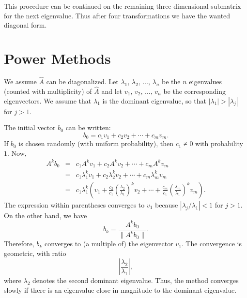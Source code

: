 This procedure can be continued on the remaining three-dimensional
submatrix for the next eigenvalue. Thus after four transformations    
we have the wanted diagonal form.
\section{Power Methods}
We assume $\hat{A}$ can be diagonalized.
Let $\lambda_1$, $\lambda_2$, $\dots$, $\lambda_n$ be the 
$n$ eigenvalues (counted with multiplicity) of $\hat{A}$ 
and let $v_1$, $v_2$, $\dots$, $v_n$ be the corresponding eigenvectors. We assume that $\lambda_1$ is the dominant eigenvalue, 
so that $|\lambda_1| > | \lambda_j |$ for $j > 1$.

The initial vector $b_0$ can be written:
\[
    b_0 = c_{1}v_{1} + c_{2}v_{2} + \cdots + c_{m}v_{m}.
\]
If $b_0$ is chosen randomly (with uniform probability), then $c_1$ ≠ 0 with probability $1$. Now,
\[
    \begin{array}{lcl}A^{k}b_0 & = & c_{1}A^{k}v_{1} + c_{2}A^{k}v_{2} + \cdots + c_{m}A^{k}v_{m} \\ & = & c_{1}\lambda_{1}^{k}v_{1} + c_{2}\lambda_{2}^{k}v_{2} + \cdots + c_{m}\lambda_{m}^{k}v_{m} \\ & = & c_{1}\lambda_{1}^{k} \left( v_{1} + \frac{c_{2}}{c_{1}}\left(\frac{\lambda_{2}}{\lambda_{1}}\right)^{k}v_{2} + \cdots + \frac{c_{m}}{c_{1}}\left(\frac{\lambda_{m}}{\lambda_{1}}\right)^{k}v_{m}\right). \end{array}
\]
The expression within parentheses converges to $v_1$ because $| \lambda_j / \lambda_1 | < 1$ for $j > 1$. On the other hand, we have
\[
    b_k = \frac{A^kb_0}{\|A^kb_0\|}. 
\]
Therefore, $b_k$ converges to (a multiple of) the eigenvector $v_1$. The convergence is geometric, with ratio
\[
    \left| \frac{\lambda_2}{\lambda_1} \right|, 
\]
where $\lambda_2$ denotes the second dominant eigenvalue. Thus, the method converges slowly if there is an eigenvalue close in magnitude to the dominant eigenvalue.

